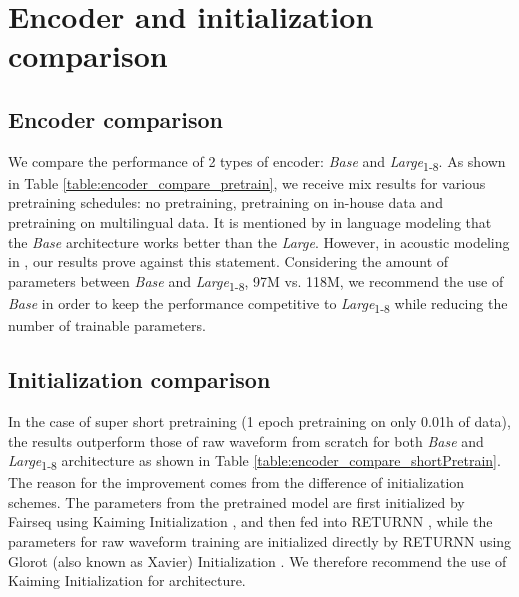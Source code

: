 \section{Encoder and initialization comparison}


\subsection{Encoder comparison}



We compare the performance of 2 types of encoder: \textit{Base} and \textit{Large}\textsubscript{1-8}.
As shown in Table \ref{table:encoder_compare_pretrain}, we receive mix results for various pretraining schedules: no pretraining, pretraining on in-house data and pretraining on multilingual data.
It is mentioned by \cite{irie2019language} in language modeling that the \textit{Base} architecture works better than the \textit{Large}.
However, in acoustic modeling in , our results prove against this statement.
Considering the amount of parameters between \textit{Base} and \textit{Large}\textsubscript{1-8}, 97M vs. 118M, we recommend the use of \textit{Base} in order to keep the performance competitive to \textit{Large}\textsubscript{1-8} while reducing the number of trainable parameters.

%
%

\subsection{Initialization comparison}



In the case of super short pretraining (1 epoch pretraining on only 0.01h of data), the results outperform those of raw waveform from scratch for both \textit{Base} and \textit{Large}\textsubscript{1-8} architecture as shown in Table \ref{table:encoder_compare_shortPretrain}.
The reason for the improvement comes from the difference of initialization schemes.
The parameters from the pretrained model are first initialized by Fairseq \cite{facebook2019fairseq} using Kaiming Initialization \cite{He_2015_ICCV}, and then fed into RETURNN \cite{doetsch2016returnn}, while the parameters for raw waveform training are initialized directly by RETURNN using Glorot (also known as Xavier) Initialization \cite{glorot2010understanding}.
We therefore recommend the use of Kaiming Initialization for  architecture.

%
%